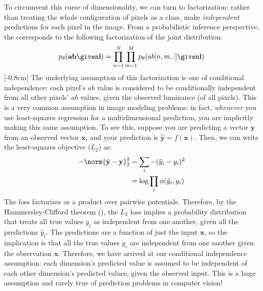 To circumvent this curse of dimensionality, we can turn to factorization: rather than treating the whole configuration of pixels as a class, make \textit{independent} predictions for each pixel in the image. From a probabilistic inference perspective, the corresponds to the following factorization of the joint distribution:
\begin{align}
    p_{\theta}(\mathbf{ab} \given \mathbf{l}) = \prod_{n=1}^N\prod_{m=1}^M  p_{\theta}(ab[n,m,:] \given \mathbf{l})
\end{align}
[-0.8cm]
The underlying assumption of this factorization is one of conditional independence: each pixel's $ab$ value is considered to be conditionally independent from all other pixels' $ab$ values, given the observed luminance (of all pixels). This is a very common assumption in image modeling problems: in fact, \textit{whenever} you use least-squares regression for a multidimensional prediction, you are implicitly making this same assumption. To see this, suppose you are predicting a vector $\mathbf{y}$ from an observed vector $\mathbf{x}$, and your prediction is $\hat{\mathbf{y}} = f(\mathbf{x})$. Then, we can write the least-squares objective ($L_2$) as:
\begin{align}
    -\norm{\hat{\mathbf{y}} - \mathbf{y}}^2_2 & = \sum_i -(\hat{y}_i - y_i)^2      \\
                                              & = \log \prod_i \phi(\hat{y}_i,y_i)
\end{align}
The loss factorizes as a product over pairwise potentials. Therefore, by the Hammersley-Clifford theorem (\chap{\ref{chapter:probabilistic_graphical_models}}), the $L_2$ loss implies a probability distribution that treats all true values $y_i$ as independent from one another, given all the predictions $\hat{y}_i$. The predictions are a function of just the input $\mathbf{x}$, so the implication is that all the true values $y_i$ are independent from one another given the observation $\mathbf{x}$. Therefore, we have arrived at our conditional independence assumption: each dimension's predicted value is assumed to be independent of each other dimension's predicted values, given the observed input. This is a huge assumption and rarely true of prediction problems in computer vision!

